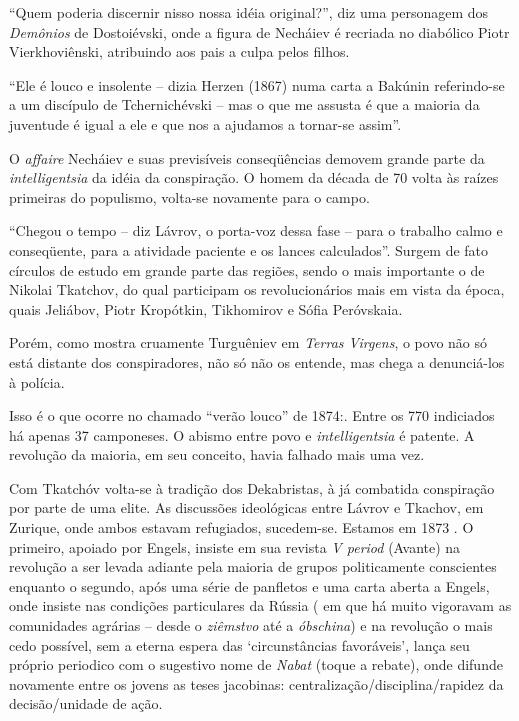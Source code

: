 ``Quem poderia discernir nisso nossa idéia original?'', diz uma
personagem dos \emph{Demônios} de Dostoiévski, onde a figura de Necháiev
é recriada no diabólico Piotr Vierkhoviênski, atribuindo aos pais a
culpa pelos filhos.

``Ele é louco e insolente -- dizia Herzen (1867) numa carta a Bakúnin
referindo-se a um discípulo de Tchernichévski -- mas o que me assusta é
que a maioria da juventude é igual a ele e que nos a ajudamos a
tornar-se assim''.

O \emph{affaire} Necháiev e suas previsíveis conseqüências demovem
grande parte da \emph{intelligentsia} da idéia da conspiração. O homem
da década de 70 volta às raízes primeiras do populismo, volta-se
novamente para o campo.

``Chegou o tempo -- diz Lávrov, o porta-voz dessa fase -- para o
trabalho calmo e conseqüente, para a atividade paciente e os lances
calculados''. Surgem de fato círculos de estudo em grande parte das
regiões, sendo o mais importante o de Nikolai Tkatchov, do qual
participam os revolucionários mais em vista da época, quais Jeliábov,
Piotr Kropótkin, Tikhomirov e Sófia Peróvskaia.

Porém, como mostra cruamente Turguêniev em \emph{Terras Virgens}, o povo
não só está distante dos conspiradores, não só não os entende, mas chega
a denunciá-los à polícia.

Isso é o que ocorre no chamado ``verão louco'' de 1874:. Entre os 770
indiciados há apenas 37 camponeses. O abismo entre povo e
\emph{intelligentsia} é patente. A revolução da maioria, em seu
conceito, havia falhado mais uma vez.

Com Tkatchóv volta-se à tradição dos Dekabristas, à já combatida
conspiração por parte de uma elite. As discussões ideológicas entre
Lávrov e Tkachov, em Zurique, onde ambos estavam refugiados, sucedem-se.
Estamos em 1873 . O primeiro, apoiado por Engels, insiste em sua revista
\emph{V period} (Avante) na revolução a ser levada adiante pela maioria
de grupos politicamente conscientes enquanto o segundo, após uma série
de panfletos e uma carta aberta a Engels, onde insiste nas condições
particulares da Rússia ( em que há muito vigoravam as comunidades
agrárias -- desde o \emph{ziêmstvo} até a \emph{óbschina}) e na
revolução o mais cedo possível, sem a eterna espera das `circunstâncias
favoráveis', lança seu próprio periodico com o sugestivo nome de
\emph{Nabat} (toque a rebate), onde difunde novamente entre os jovens as
teses jacobinas: centralização/disciplina/rapidez da decisão/unidade de
ação.

